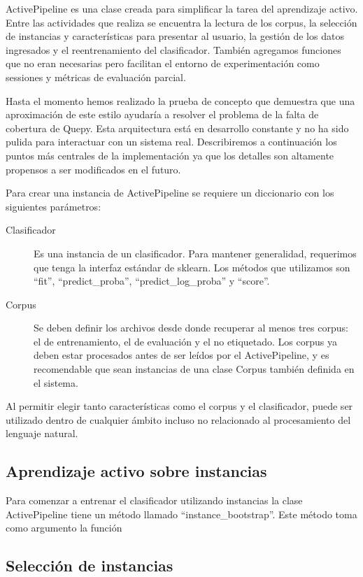 ActivePipeline es una clase creada para simplificar la tarea del aprendizaje activo. Entre las actividades que realiza se encuentra la lectura de los corpus, la selección de instancias y características para presentar al usuario, la gestión de los datos ingresados y el reentrenamiento del clasificador. También agregamos funciones que no eran necesarias pero facilitan el entorno de experimentación como sessiones y métricas de evaluación parcial.

Hasta el momento hemos realizado la prueba de concepto que demuestra que una aproximación de este estilo ayudaría a resolver el problema de la falta de cobertura de Quepy. Esta arquitectura está en desarrollo constante y no ha sido pulida para interactuar con un sistema real. Describiremos a continuación los puntos más centrales de la implementación ya que los detalles son altamente propensos a ser modificados en el futuro.

Para crear una instancia de ActivePipeline se requiere un diccionario con los siguientes parámetros:
\begin{description}
	\item[Clasificador] Es una instancia de un clasificador. Para mantener generalidad, requerimos que tenga la interfaz estándar de sklearn. Los métodos que utilizamos son ``fit'', ``predict\_proba'', ``predict\_log\_proba'' y ``score''.
	\item[Corpus] Se deben definir los archivos desde donde recuperar al menos tres corpus: el de entrenamiento, el de evaluación y el no etiquetado. Los corpus ya deben estar procesados antes de ser leídos por el ActivePipeline, y es recomendable que sean instancias de una clase Corpus también definida en el sistema.
\end{description}
Al permitir elegir tanto características como el corpus y el clasificador, puede ser utilizado dentro de cualquier ámbito incluso no relacionado al procesamiento del lenguaje natural.

\subsection{Aprendizaje activo sobre instancias}
Para comenzar a entrenar el clasificador utilizando instancias la clase ActivePipeline tiene un método llamado ``instance\_bootstrap''. Este método toma como argumento la función


\subsection{Selección de instancias}
